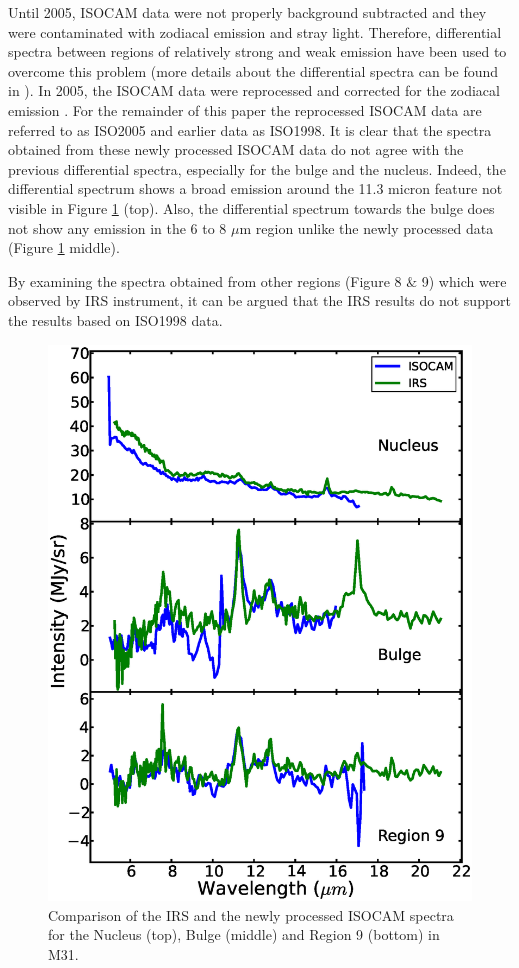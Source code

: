\documentclass[useAMS,usenatbib,a4paper]{mn2e}
\begin{document}
	Until 2005, ISOCAM data were not properly background subtracted and they were contaminated with zodiacal emission and stray light. Therefore, differential spectra between regions of relatively strong and weak emission have been used to overcome this problem (more details about the differential spectra can be found in \citealt{1998Cesarsky}). In 2005, the ISOCAM data were reprocessed  and corrected for the zodiacal emission \citep{Boulanger_F_2005}. For the remainder of this paper the reprocessed ISOCAM data are referred to as ISO2005 and earlier data as ISO1998. It is clear that the spectra obtained from these newly processed ISOCAM data do not agree with the previous differential spectra, especially for the bulge and the nucleus. Indeed, the differential spectrum shows a broad emission around the 11.3 micron feature not visible in Figure \ref{ISOnIRS} (top). Also, the differential spectrum towards the bulge does not show any emission in the 6 to 8 $\mu$m region unlike the newly processed data (Figure \ref{ISOnIRS} middle).

	By examining the spectra obtained from other regions (Figure 8 $\&$ 9) which were observed by IRS instrument, it can be argued that the IRS results do not support the results based on ISO1998 data.


\begin{figure}
\centering
\includegraphics[scale=0.35]{./ISOvsIRS.eps}
\caption{ Comparison of the IRS and the newly processed ISOCAM spectra for the Nucleus (top), Bulge (middle) and Region 9 (bottom) in M31.}
\label{ISOnIRS}
\end{figure}
\end{document}
